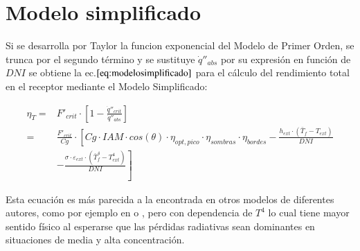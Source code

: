 \section{Modelo simplificado}
Si se desarrolla por Taylor la funcion exponencial del Modelo de Primer Orden, se trunca por el segundo término y se sustituye \(\dot q''_{abs}\) por su expresión en función de \(DNI\) se obtiene la ec.\(\eqref{eq:modelosimplificado}\) para el cálculo del rendimiento total en el receptor mediante el Modelo Simplificado:

\begin{equation}
\begin{split}
\eta_{T}	 = & F'_{crit} \cdot \left[1 - \frac{\dot q''_{crit}}{\dot q''_{abs}}\right]  \\
 		 = & \frac{F'_{crit}}{Cg} \cdot \left[Cg \cdot IAM \cdot cos(\theta) \cdot \eta_{opt,pico} \cdot \eta_{sombras} \cdot \eta_{bordes}\right. - \frac{h_{ext}\cdot (\bar{T}_{f}-T_{ext})}{DNI} \\
& \left. - \frac{\sigma \cdot \varepsilon_{ext}\cdot(\bar{T}^{4}_{f}-T^{4}_{ext})}{DNI}\right] 
\end{split}
    \label{eq:modelosimplificado}
\end{equation}

Esta ecuación es más parecida a la encontrada en otros modelos de diferentes autores, como por ejemplo en \cite{hottelEvaluationFlatplateSolar1955} o \cite{fraidenraichImprovedSolutionsTemperature1997a}, pero con dependencia de \(T^{4}\) lo cual tiene mayor sentido físico al esperarse que las pérdidas radiativas sean dominantes en situaciones de media y alta concentración.

